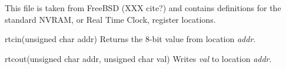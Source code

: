 \begin{apisyn}
\end{apisyn}
\begin{apidesc}
        This file is taken from FreeBSD (XXX cite?) and contains
        definitions for the standard NVRAM, or Real Time Clock,
        register locations.

	\begin{csymlist}
	\item[rtcin(unsigned char addr)]
		Returns the 8-bit value from location \emph{addr}.
	\item[rtcout(unsigned char addr, unsigned char val)]
		Writes \emph{val} to location \emph{addr}.
	\end{csymlist}
\end{apidesc}

\label{kern-x86-procman}

